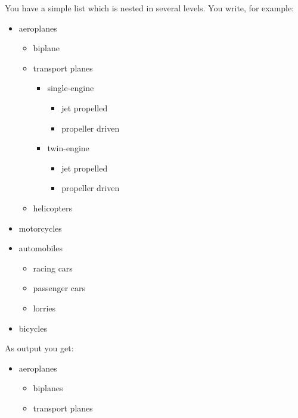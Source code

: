     \begin{Example}
      You have a simple list which is nested in several levels. You write,
      for example:
\begin{lstcode}
  \begin{itemize}
    \item aeroplanes
    \begin{itemize}
      \item biplane
      \item transport planes
      \begin{itemize}
        \item single-engine
        \begin{itemize}
          \item jet propelled
          \item propeller driven
        \end{itemize}
        \item twin-engine
        \begin{itemize}
	      \item jet propelled
		  \item propeller driven
		\end{itemize}
      \end{itemize}
      \item helicopters
    \end{itemize}
    \item motorcycles
    \item automobiles
    \begin{itemize}
      \item racing cars
      \item passenger cars
      \item lorries
    \end{itemize}
    \item bicycles
  \end{itemize}
\end{lstcode}
      As output you get:
      \begin{ShowOutput}[\baselineskip]
        \begin{itemize}
        \item aeroplanes
          \begin{itemize}
          \item biplanes
          \item transport planes
            \begin{itemize}

\end{itemize}
\end{itemize}
\end{itemize}
\end{ShowOutput}
\end{Example}
